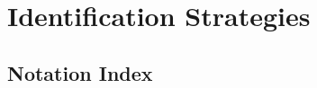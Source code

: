 \documentclass[11pt, twoside, openright]{book}
\theoremstyle{econstyle}
\theoremstyle{defstyle}
\begin{document}



\part{Identification Strategies}








\backmatter

\chapter*{Notation Index}
\end{document}
